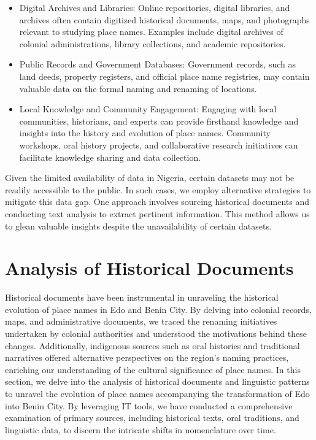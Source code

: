 \begin{itemize}
    \item Digital Archives and Libraries: Online repositories, digital libraries, and archives often contain digitized historical documents, maps, and photographs relevant to studying place names. Examples include digital archives of colonial administrations, library collections, and academic repositories.
    \item Public Records and Government Databases: Government records, such as land deeds, property registers, and official place name registries, may contain valuable data on the formal naming and renaming of locations.
    \item Local Knowledge and Community Engagement: Engaging with local communities, historians, and experts can provide firsthand knowledge and insights into the history and evolution of place names. Community workshops, oral history projects, and collaborative research initiatives can facilitate knowledge sharing and data collection.
\end{itemize}

Given the limited availability of data in Nigeria, certain datasets may not be readily accessible to the public. In such cases, we employ alternative strategies to mitigate this data gap. One approach involves sourcing historical documents and conducting text analysis to extract pertinent information. This method allows us to glean valuable insights despite the unavailability of certain datasets.
\section{Analysis of Historical Documents}
Historical documents have been instrumental in unraveling the historical evolution of place names in Edo and Benin City. By delving into colonial records, maps, and administrative documents, we traced the renaming initiatives undertaken by colonial authorities and understood the motivations behind these changes. Additionally, indigenous sources such as oral histories and traditional narratives offered alternative perspectives on the region's naming practices, enriching our understanding of the cultural significance of place names.
In this section, we delve into the analysis of historical documents and linguistic patterns to unravel the evolution of place names accompanying the transformation of Edo into Benin City. By leveraging IT tools, we have conducted a comprehensive examination of primary sources, including historical texts, oral traditions, and linguistic data, to discern the intricate shifts in nomenclature over time.

